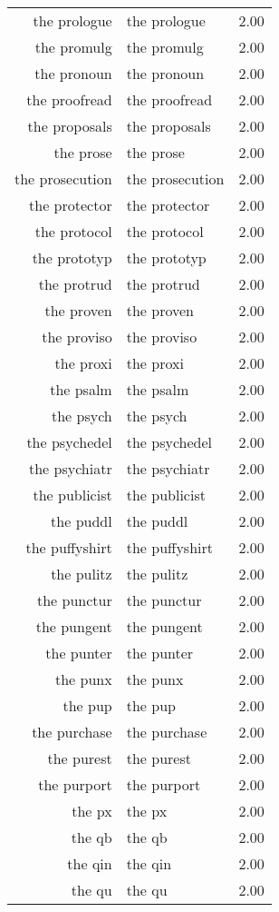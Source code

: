 \begin{table}[ht]
\begin{tabular}{rlr}
  the prologue & the prologue & 2.00 \\ 
  the promulg & the promulg & 2.00 \\ 
  the pronoun & the pronoun & 2.00 \\ 
  the proofread & the proofread & 2.00 \\ 
  the proposals & the proposals & 2.00 \\ 
  the prose & the prose & 2.00 \\ 
  the prosecution & the prosecution & 2.00 \\ 
  the protector & the protector & 2.00 \\ 
  the protocol & the protocol & 2.00 \\ 
  the prototyp & the prototyp & 2.00 \\ 
  the protrud & the protrud & 2.00 \\ 
  the proven & the proven & 2.00 \\ 
  the proviso & the proviso & 2.00 \\ 
  the proxi & the proxi & 2.00 \\ 
  the psalm & the psalm & 2.00 \\ 
  the psych & the psych & 2.00 \\ 
  the psychedel & the psychedel & 2.00 \\ 
  the psychiatr & the psychiatr & 2.00 \\ 
  the publicist & the publicist & 2.00 \\ 
  the puddl & the puddl & 2.00 \\ 
  the puffyshirt & the puffyshirt & 2.00 \\ 
  the pulitz & the pulitz & 2.00 \\ 
  the punctur & the punctur & 2.00 \\ 
  the pungent & the pungent & 2.00 \\ 
  the punter & the punter & 2.00 \\ 
  the punx & the punx & 2.00 \\ 
  the pup & the pup & 2.00 \\ 
  the purchase & the purchase & 2.00 \\ 
  the purest & the purest & 2.00 \\ 
  the purport & the purport & 2.00 \\ 
  the px & the px & 2.00 \\ 
  the qb & the qb & 2.00 \\ 
  the qin & the qin & 2.00 \\ 
  the qu & the qu & 2.00 \\ 

\end{tabular}
\end{table}
